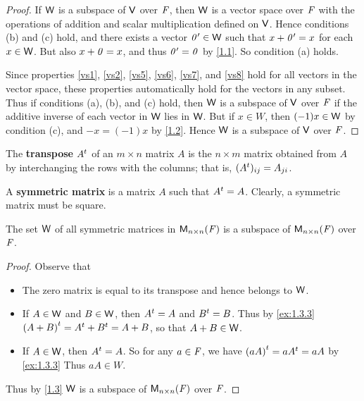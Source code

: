 \begin{proof}
	If \(\mathsf{W}\) is a subspace of \(\mathsf{V}\) over \(\mathit{F}\), then \(\mathsf{W}\) is a vector space over \(\mathit{F}\) with the operations of addition and scalar multiplication defined on \(\mathsf{V}\).
	Hence conditions (b) and (c) hold, and there exists a vector \(\mathit{0}' \in \mathsf{W}\) such that \(x + \mathit{0}' = x\) for each \(x \in \mathsf{W}\).
	But also \(x + \mathit{0} = x\), and thus \(\mathit{0}' = \mathit{0}\) by \cref{1.1}.
	So condition (a) holds.

	Since properties \ref{vs1}, \ref{vs2}, \ref{vs5}, \ref{vs6}, \ref{vs7}, and \ref{vs8} hold for all vectors in the vector space, these properties automatically hold for the vectors in any subset.
	Thus if conditions (a), (b), and (c) hold, then \(\mathsf{W}\) is a subspace of \(\mathsf{V}\) over \(\mathit{F}\) if the additive inverse of each vector in \(\mathsf{W}\) lies in \(\mathsf{W}\).
	But if \(x \in W\), then \((-1) x \in \mathsf{W}\) by condition (c), and \(-x = (-1) x\) by \cref{1.2}.
	Hence \(\mathsf{W}\) is a subspace of \(\mathsf{V}\) over \(\mathit{F}\).
\end{proof}

\begin{defn}\label{1.3.3}
	The \textbf{transpose} \({A}^{t}\) of an \(m \times n\) matrix \(A\) is the \(n \times m\) matrix obtained from \(A\) by interchanging the rows with the columns;
	that is, \(({A}^{t})_{i j} = A_{j i}\).
\end{defn}

\begin{defn}\label{1.3.4}
	A \textbf{symmetric matrix} is a matrix \(A\) such that \({A}^{t} = A\).
	Clearly, a symmetric matrix must be square.
\end{defn}

\begin{eg}\label{1.3.5}
	The set \(\mathsf{W}\) of all symmetric matrices in \(\mathsf{M}_{{n} \times n}({\mathit{F}})\) is a subspace of \(\mathsf{M}_{{n} \times n}({\mathit{F}})\) over \(\mathit{F}\).
\end{eg}

\begin{proof}
	Observe that
	\begin{itemize}
		\item The zero matrix is equal to its transpose and hence belongs to \(\mathsf{W}\).
		\item If \(A \in \mathsf{W}\) and \(B \in \mathsf{W}\), then \({A}^{t} = A\) and \({B}^{t} = B\).
		      Thus by \cref{ex:1.3.3} \({(A + B)}^{t} = {A}^{t} + {B}^{t} = A + B\), so that \(A + B \in \mathsf{W}\).
		\item If \(A \in \mathsf{W}\), then \({A}^{t} = A\).
		      So for any \(a \in \mathit{F}\), we have \({(aA)}^{t} = a{A}^{t} = aA\) by \cref{ex:1.3.3}
		      Thus \(aA \in W\).
	\end{itemize}
	Thus by \cref{1.3} \(\mathsf{W}\) is a subspace of \(\mathsf{M}_{{n} \times n}({\mathit{F}})\) over \(\mathit{F}\).
\end{proof}

